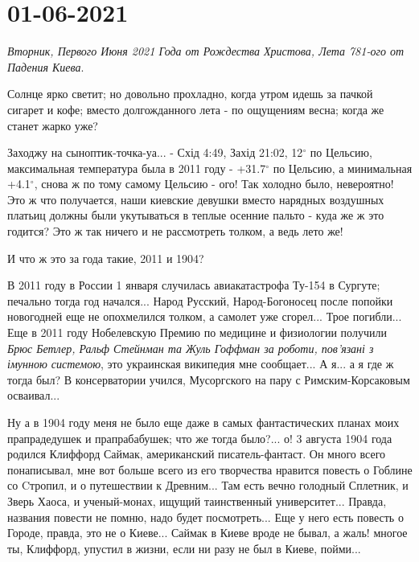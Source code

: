  
 
 
 
 
\section{01-06-2021}
\label{sec:kiev.pogoda.01_06_2021}

\emph{Вторник, Первого Июня 2021 Года от Рождества Христова, Лета 781-ого от Падения Киева}.

Солнце ярко светит; но довольно прохладно, когда утром идешь за пачкой сигарет
и кофе; вместо долгожданного лета - по ощущениям весна; когда же станет жарко
уже?

Заходжу на сыноптик-точка-уа... - Схід 4:49, Захід 21:02, 12$^{\circ}$ по
Цельсию, максимальная температура была в 2011 году - +31.7$^{\circ}$ по
Цельсию, а минимальная +4.1$^{\circ}$, снова ж по тому самому Цельсию - ого!
Так холодно было, невероятно! Это ж что получается, наши киевские девушки
вместо нарядных воздушных платьиц должны были укутываться в теплые осенние
пальто - куда же ж это годится? Это ж так ничего и не рассмотреть толком, а
ведь лето же!

И что ж это за года такие, 2011 и 1904?

В 2011 году в России 1 января случилась авиакатастрофа Ту-154 в Сургуте;
печально тогда год начался... Народ Русский, Народ-Богоносец после попойки
новогодней еще не опохмелился толком, а самолет уже сгорел... Трое погибли...
Еще в 2011 году Нобелевскую Премию по медицине и физиологии получили \emph{Брюс
Бетлер, Ральф Стейнман та Жуль Гоффман за роботи, пов'язані з імунною
системою}, это украинская википедия мне сообщает...  А я... а я где ж тогда
был? В консерватории учился, Мусоргского на пару с Римским-Корсаковым
осваивал...

Ну а в 1904 году меня не было еще даже в самых фантастических планах моих
прапрадедушек и прапрабабушек; что же тогда было?... о! 3 августа 1904 года
родился Клиффорд Саймак, американский писатель-фантаст. Он много всего
понаписывал, мне вот больше всего из его творчества нравится повесть о Гоблине
со Cтропил, и о путешествии к Древним... Там есть вечно голодный Сплетник, и
Зверь Хаоса, и ученый-монах, ищущий таинственный университет... Правда,
названия повести не помню, надо будет посмотреть...  Еще у него есть повесть о
Городе, правда, это не о Киеве... Саймак в Киеве вроде не бывал, а жаль! многое
ты, Клиффорд, упустил в жизни, если ни разу не был в Киеве, пойми...

